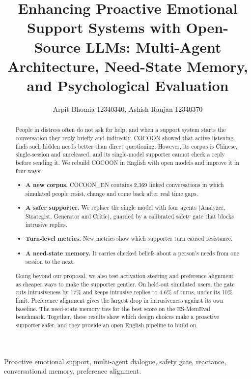 \documentclass[journal]{IEEEtran}
\begin{document}
\raggedbottom
\title{Enhancing Proactive Emotional Support Systems with Open-Source LLMs: Multi-Agent Architecture, Need-State Memory, and Psychological Evaluation}
\author{Arpit Bhomia-12340340, Ashish Ranjan-12340370}
\markboth{}{}
\maketitle

\begin{abstract}
People in distress often do not ask for help, and when a support system starts the conversation they reply briefly and indirectly. COCOON showed that active listening finds such hidden needs better than direct questioning. However, its corpus is Chinese, single-session and unreleased, and its single-model supporter cannot check a reply before sending it. We rebuild COCOON in English with open models and improve it in four ways:
\begin{itemize}
\item \textbf{A new corpus.} COCOON\_EN contains 2,369 linked conversations in which simulated people resist, change and come back after real time gaps.
\item \textbf{A safer supporter.} We replace the single model with four agents (Analyzer, Strategist, Generator and Critic), guarded by a calibrated safety gate that blocks intrusive replies.
\item \textbf{Turn-level metrics.} New metrics show which supporter turn caused resistance.
\item \textbf{A need-state memory.} It carries checked beliefs about a person's needs from one session to the next.
\end{itemize}
Going beyond our proposal, we also test activation steering and preference alignment as cheaper ways to make the supporter gentler. On held-out simulated users, the gate cuts intrusiveness by 17\% and keeps intrusive replies to 4.6\% of turns, under its 10\% limit. Preference alignment gives the largest drop in intrusiveness against its own baseline. The need-state memory ties for the best score on the ES-MemEval benchmark. Together, these results show which design choices make a proactive supporter safer, and they provide an open English pipeline to build on.
\end{abstract}

\begin{IEEEkeywords}
Proactive emotional support, multi-agent dialogue, safety gate, reactance, conversational memory, preference alignment.
\end{IEEEkeywords}
\end{document}

